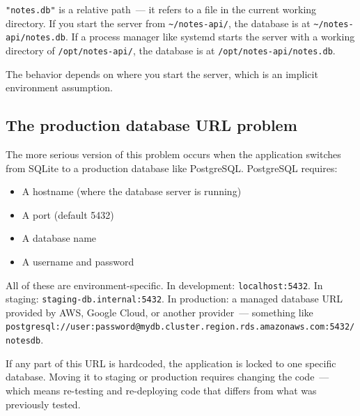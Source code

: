 \noindent{}\texttt{"notes.db"} is a relative path~--- it refers to a file in the current working directory. If you start the server from \texttt{\textasciitilde{}/notes-api/}, the database is at \texttt{\textasciitilde{}/}\allowbreak{}\texttt{notes-api/}\allowbreak{}\texttt{notes.db}. If a process manager like systemd starts the server with a working directory of \texttt{/opt/notes-api/}, the database is at \texttt{/}\allowbreak{}\texttt{opt/}\allowbreak{}\texttt{notes-api/}\allowbreak{}\texttt{notes.db}.

The behavior depends on where you start the server, which is an implicit environment assumption.

\subsection*{The production database URL problem}\label{09-configuration-coupling:the-production-database-url-problem}

The more serious version of this problem occurs when the application switches from SQLite to a production database like PostgreSQL. PostgreSQL requires:

\begin{itemize}
\tightlist
\item
  A hostname (where the database server is running)
\item
  A port (default 5432)
\item
  A database name
\item
  A username and password
\end{itemize}

\noindent{}All of these are environment-specific. In development: \texttt{localhost:5432}. In staging: \texttt{staging-}\allowbreak{}\texttt{db.}\allowbreak{}\texttt{internal:}\allowbreak{}\texttt{5432}. In production: a managed database URL provided by AWS, Google Cloud, or another provider~--- something like \texttt{postgresql:}\allowbreak{}\texttt{/}\allowbreak{}\texttt{/}\allowbreak{}\texttt{user:}\allowbreak{}\texttt{password@mydb.}\allowbreak{}\texttt{cluster.}\allowbreak{}\texttt{region.}\allowbreak{}\texttt{rds.}\allowbreak{}\texttt{amazonaws.}\allowbreak{}\texttt{com:}\allowbreak{}\texttt{5432/}\allowbreak{}\texttt{notesdb}.

If any part of this URL is hardcoded, the application is locked to one specific database. Moving it to staging or production requires changing the code~--- which means re-testing and re-deploying code that differs from what was previously tested.

